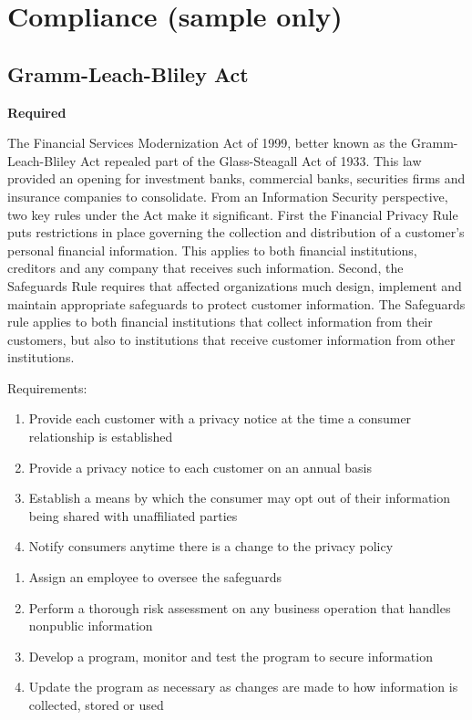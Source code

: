 \documentclass{needs}
\begin{document}
		\section{Compliance (sample only)}
		
			\subsection{Gramm-Leach-Bliley Act}
			  {\color{red}\bfseries Required}
			
			The Financial Services Modernization Act of 1999, better known as the Gramm-Leach-Bliley Act repealed part of the Glass-Steagall Act of 1933.  This law provided an opening for investment banks, commercial banks, securities firms and insurance companies to consolidate.
			From an Information Security perspective, two key rules under the Act make it significant.  First the Financial Privacy Rule puts restrictions in place governing the collection and distribution of a customer’s personal financial information.  This applies to both financial institutions, creditors and any company that receives such information.  Second, the Safeguards Rule requires that affected organizations much design, implement and maintain appropriate safeguards to protect customer information.  The Safeguards rule applies to both financial institutions that collect information from their customers, but also to institutions that receive customer information from other institutions.
			
			Requirements:
			
			\begin{enumerate}
				\item Provide each customer with a privacy notice at the time a consumer relationship is established
				\item Provide a privacy notice to each customer on an annual basis
				\item Establish a means by which the consumer may opt out of their information being shared with unaffiliated parties
				\item Notify consumers anytime there is a change to the privacy policy
			\end{enumerate}
			\begin{enumerate}
				\item Assign an employee to oversee the safeguards
				\item Perform a thorough risk assessment on any business operation that handles nonpublic information
				\item Develop a program, monitor and test the program to secure information
				\item Update the program as necessary as changes are made to how information is collected, stored or used
			\end{enumerate}			
\end{document}
